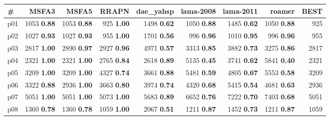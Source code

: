 \begin{tabular}{|l|rrrrrrr|r|}
\hline
\textbf{\#} & \textbf{MSFA3} & \textbf{MSFA5} & \textbf{RRAPN} & \textbf{dae\_yahsp} & \textbf{lama-2008} & \textbf{lama-2011} & \textbf{roamer} & \textbf{BEST}\\
\hline
p01 & {\footnotesize 1053} \textbf{0.88} & {\footnotesize 1053} \textbf{0.88} & {\footnotesize 925} \textbf{1.00} & {\footnotesize 1498} \textbf{0.62} & {\footnotesize 1050} \textbf{0.88} & {\footnotesize 1485} \textbf{0.62} & {\footnotesize 1050} \textbf{0.88} & 925\\
p02 & {\footnotesize 1027} \textbf{0.93} & {\footnotesize 1027} \textbf{0.93} & {\footnotesize 955} \textbf{1.00} & {\footnotesize 1701} \textbf{0.56} & {\footnotesize 996} \textbf{0.96} & {\footnotesize 1010} \textbf{0.95} & {\footnotesize 996} \textbf{0.96} & 955\\
p03 & {\footnotesize 2817} \textbf{1.00} & {\footnotesize 2890} \textbf{0.97} & {\footnotesize 2927} \textbf{0.96} & {\footnotesize 4971} \textbf{0.57} & {\footnotesize 3313} \textbf{0.85} & {\footnotesize 3882} \textbf{0.73} & {\footnotesize 3275} \textbf{0.86} & 2817\\
p04 & {\footnotesize 2321} \textbf{1.00} & {\footnotesize 2321} \textbf{1.00} & {\footnotesize 2765} \textbf{0.84} & {\footnotesize 2618} \textbf{0.89} & {\footnotesize 5135} \textbf{0.45} & {\footnotesize 3741} \textbf{0.62} & {\footnotesize 5841} \textbf{0.40} & 2321\\
p05 & {\footnotesize 3209} \textbf{1.00} & {\footnotesize 3209} \textbf{1.00} & {\footnotesize 4327} \textbf{0.74} & {\footnotesize 3661} \textbf{0.88} & {\footnotesize 5481} \textbf{0.59} & {\footnotesize 4805} \textbf{0.67} & {\footnotesize 5553} \textbf{0.58} & 3209\\
p06 & {\footnotesize 3322} \textbf{0.88} & {\footnotesize 2936} \textbf{1.00} & {\footnotesize 3663} \textbf{0.80} & {\footnotesize 3974} \textbf{0.74} & {\footnotesize 4320} \textbf{0.68} & {\footnotesize 5415} \textbf{0.54} & {\footnotesize 4681} \textbf{0.63} & 2936\\
p07 & {\footnotesize 5051} \textbf{1.00} & {\footnotesize 5051} \textbf{1.00} & {\footnotesize 5073} \textbf{1.00} & {\footnotesize 5683} \textbf{0.89} & {\footnotesize 6652} \textbf{0.76} & {\footnotesize 7222} \textbf{0.70} & {\footnotesize 7403} \textbf{0.68} & 5051\\
p08 & {\footnotesize 1360} \textbf{0.78} & {\footnotesize 1360} \textbf{0.78} & {\footnotesize 1059} \textbf{1.00} & {\footnotesize 2067} \textbf{0.51} & {\footnotesize 1211} \textbf{0.87} & {\footnotesize 1452} \textbf{0.73} & {\footnotesize 1211} \textbf{0.87} & 1059\\

\end{tabular}
